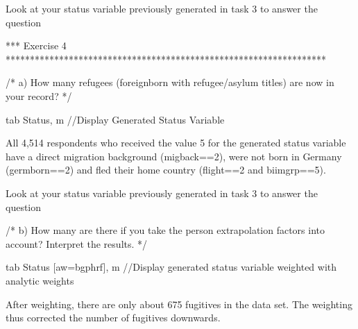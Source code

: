 \documentclass[letterpaper,10pt,openany,onesideH,english]{sphinxmanual}
\begin{document}


Look at your status variable previously generated in task 3 to answer the question

%
\begin{sphinxVerbatim}[commandchars=\\\{\},numbers=left,firstnumber=1,stepnumber=1]
*** Exercise 4 ******************************************************************

/*
a)	How many refugees (foreign\PYGZhy{}born with refugee/asylum titles) are now in your record?
*/

tab Status, m //Display Generated Status Variable
\end{sphinxVerbatim}

\begin{figure}[H]
\centering

\noindent{}
\end{figure}

All 4,514 respondents who received the value 5 for the generated status variable have a direct migration background (migback==2), were not born in Germany (germborn==2) and fled their home country (flight==2 and biimgrp==5).


Look at your status variable previously generated in task 3 to answer the question

%
\begin{sphinxVerbatim}[commandchars=\\\{\},numbers=left,firstnumber=1,stepnumber=1]
/*
b)	How many are there if you take the person extrapolation factors into account? Interpret the results.
*/

tab Status [aw=bgphrf], m  //Display generated status variable weighted with analytic weights
\end{sphinxVerbatim}

\begin{figure}[H]
\centering

\noindent{}
\end{figure}

After weighting, there are only about 675 fugitives in the data set.
The weighting thus corrected the number of fugitives downwards.
\end{document}
